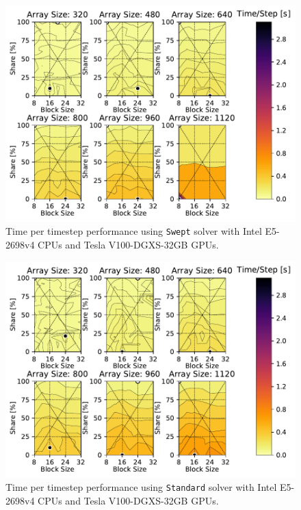 \documentclass[mca,article,submit,moreauthors,pdftex]{Definitions/mdpi}
\def\Swept{\texttt{Swept}}
\def\Standard{\texttt{Standard}}
\def\newCPU{Intel E5-2698v4} %
\def\newGPU{Tesla V100-DGXS-32GB}
\begin{document}
\nointerlineskip
\renewcommand\thefigure{\Alph{figure}} 
\begin{figure}[htbp]
    \widefigure
    \includegraphics[scale=0.85]{figs/timePerStepSweptheatNew.pdf}
    \caption{Time per timestep performance using \Swept{} solver with \newCPU{} CPUs and \newGPU{} GPUs.}
    \label{fig:tptNewHeatSwept} 
\end{figure}

\begin{figure}[htbp]
    \widefigure
    \includegraphics[scale=0.85]{figs/timePerStepStandardheatNew.pdf}
    \caption{Time per timestep performance using \Standard{} solver with \newCPU{} CPUs and \newGPU{} GPUs.}
    \label{fig:tptNewHeatStandard} 
\end{figure}
\end{document}
